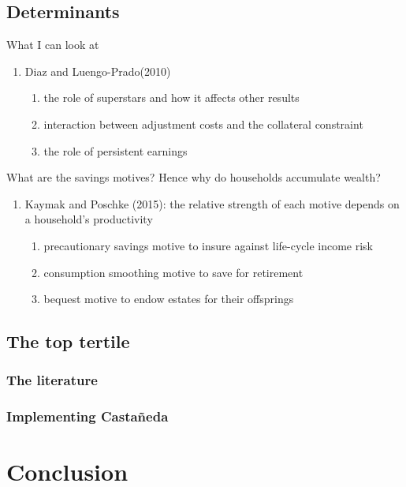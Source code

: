 \documentclass[a4paper,12pt]{article}
\begin{document}
\subsection{Determinants}
What I can look at
\begin{enumerate}
\item Diaz and Luengo-Prado(2010)
\begin{enumerate}
\item the role of superstars and how it affects other results
\item interaction between adjustment costs and the collateral constraint
\item the role of persistent earnings
\end{enumerate}

\end{enumerate}
What are the savings motives? Hence why do households accumulate wealth?
\begin{enumerate}
\item Kaymak and Poschke (2015): the relative strength of each motive depends on a household's productivity
\begin{enumerate}
\item precautionary savings motive to insure against life-cycle income risk
\item consumption smoothing motive to save for retirement
\item bequest motive to endow estates for their offsprings
\end{enumerate}
\end{enumerate}


\subsection{The top tertile}
\subsubsection{The literature}
\subsubsection{Implementing Casta\~{n}eda}
\section{Conclusion}
\label{Chapter6}


\newpage


\end{document}
